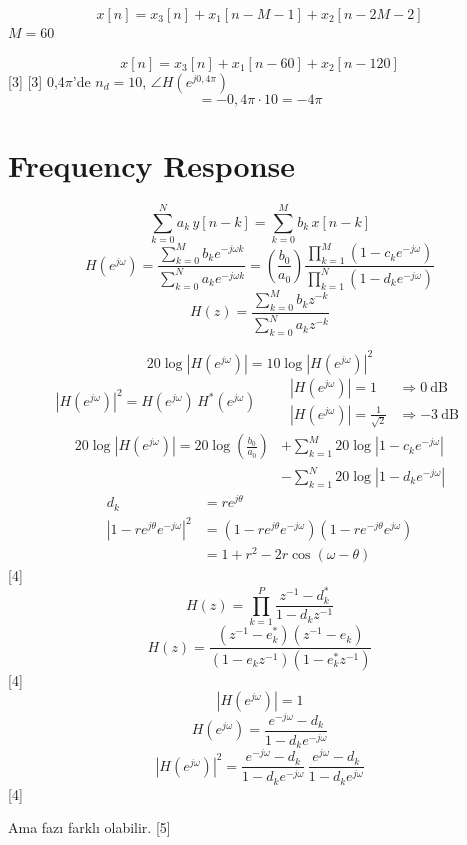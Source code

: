 \documentclass[11pt,a4paper]{article}
\begin{document}
\[ x[n] = x_3[n] + x_1[n-M-1] + x_2[n-2M-2] \]
$M = 60$

\[ x[n] = x_3[n] + x_1[n-60] + x_2[n-120] \]
[3]
[3]
0,4$\pi$'de $n_d = 10$, \quad $\angle H(e^{j0{,}4\pi})$
\[ = -0{,}4\pi \cdot 10 = -4\pi \]

\section{Frequency Response}
\[ \sum_{k=0}^{N} a_k\, y[n-k] = \sum_{k=0}^{M} b_k\, x[n-k] \]
\[ H(e^{j\omega}) = \frac{\sum_{k=0}^{M} b_k e^{-j\omega k}}{\sum_{k=0}^{N} a_k e^{-j\omega k}} = \left(\frac{b_0}{a_0}\right) \frac{\prod_{k=1}^{M}(1-c_k e^{-j\omega})}{\prod_{k=1}^{N}(1-d_k e^{-j\omega})} \]
\[ H(z) = \frac{\sum_{k=0}^{M} b_k z^{-k}}{\sum_{k=0}^{N} a_k z^{-k}} \]

\[ 20\log|H(e^{j\omega})| = 10\log|H(e^{j\omega})|^2 \]
\[ |H(e^{j\omega})|^2 = H(e^{j\omega})\,H^*(e^{j\omega}) \qquad \begin{aligned}|H(e^{j\omega})| = 1 &\Rightarrow 0\ \mathrm{dB}\\ |H(e^{j\omega})| = \tfrac{1}{\sqrt{2}} &\Rightarrow -3\ \mathrm{dB}\end{aligned} \]
\begin{align*}
20\log|H(e^{j\omega})| = 20\log\left(\frac{b_0}{a_0}\right) &+ \sum_{k=1}^{M} 20\log|1-c_k e^{-j\omega}|\\
&- \sum_{k=1}^{N} 20\log|1-d_k e^{-j\omega}|
\end{align*}
\begin{align*}
d_k &= r e^{j\theta}\\
|1 - re^{j\theta}e^{-j\omega}|^2 &= (1 - re^{j\theta}e^{-j\omega})(1 - re^{-j\theta}e^{j\omega})\\
&= 1 + r^2 - 2r\cos(\omega - \theta)
\end{align*}
[4]
\[ H(z) = \prod_{k=1}^{P} \frac{z^{-1} - d_k^*}{1 - d_k z^{-1}} \]
\[ H(z) = \frac{(z^{-1} - e_k^*)(z^{-1} - e_k)}{(1 - e_k z^{-1})(1 - e_k^* z^{-1})} \]
[4]
\[ |H(e^{j\omega})| = 1 \]
\[ H(e^{j\omega}) = \frac{e^{-j\omega} - d_k}{1 - d_k e^{-j\omega}} \]
\[ |H(e^{j\omega})|^2 = \frac{e^{-j\omega} - d_k}{1 - d_k e^{-j\omega}}\,\frac{e^{j\omega} - d_k}{1 - d_k e^{j\omega}} \]
[4]

Ama fazı farklı olabilir.
[5]
\end{document}
